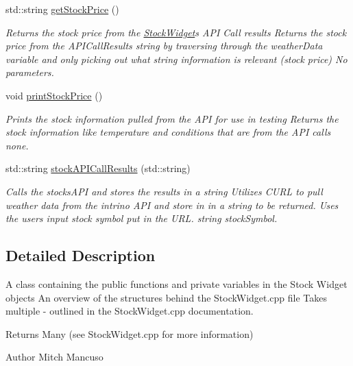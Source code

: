 \begin{DoxyCompactItemize}
std\+::string \mbox{\hyperlink{class_stock_widget_ad053fb0af2da4413c337771fa083bc07}{get\+Stock\+Price}} ()
\begin{DoxyCompactList}\small\item\em Returns the stock price from the \mbox{\hyperlink{class_stock_widget}{Stock\+Widget}}\textquotesingle{}s A\+PI Call results  Returns the stock price from the A\+P\+I\+Call\+Results string by traversing through the weather\+Data variable and only picking out what string information is relevant (stock price)  No parameters. \end{DoxyCompactList}\item 
void \mbox{\hyperlink{class_stock_widget_a696f274d7915cd579062e98d268b4be4}{print\+Stock\+Price}} ()
\begin{DoxyCompactList}\small\item\em Prints the stock information pulled from the A\+PI for use in testing  Returns the stock information like temperature and conditions that are from the A\+PI calls  none. \end{DoxyCompactList}\item 
std\+::string \mbox{\hyperlink{class_stock_widget_af1da71cd53153f27818aa6afb94cb50b}{stock\+A\+P\+I\+Call\+Results}} (std\+::string)
\begin{DoxyCompactList}\small\item\em Calls the stocks\+A\+PI and stores the results in a string  Utilizes C\+U\+RL to pull weather data from the intrino A\+PI and store in in a string to be returned. Uses the user\textquotesingle{}s input stock symbol put in the U\+RL.  string stock\+Symbol. \end{DoxyCompactList}\end{DoxyCompactItemize}


\subsection{Detailed Description}
A class containing the public functions and private variables in the Stock Widget objects  An overview of the structures behind the Stock\+Widget.\+cpp file  Takes multiple -\/ outlined in the Stock\+Widget.\+cpp documentation. 

\begin{DoxyReturn}{Returns}
Many (see Stock\+Widget.\+cpp for more information) 
\end{DoxyReturn}
\begin{DoxyAuthor}{Author}
Mitch Mancuso 
\end{DoxyAuthor}


